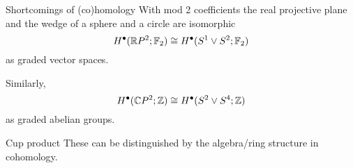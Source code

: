 \begin{frame}{Shortcomings of (co)homology}
	\pause With mod 2 coefficients the real projective plane and the wedge of a sphere and a circle are isomorphic
	\[
	H^\bullet(\mathbb{R} P^2; {\mathbb{F}_2}) \cong H^\bullet(S^1 \vee S^2; {\mathbb{F}_2})
	\]
	as graded vector spaces.

	\bigskip \pause
	Similarly,
	\[
	H^\bullet(\mathbb{C} P^2; \mathbb{Z}) \cong H^\bullet(S^2 \vee S^4; \mathbb{Z})
	\]
	as graded abelian groups.

	\bigskip \pause
	\begin{block}{Cup product}
		These can be distinguished by the algebra/ring structure in cohomology.
	\end{block}
\end{frame}